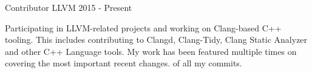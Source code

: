 
\begin{cventries}

  \cventry
    {Contributor}
    {LLVM}
    {}
    {2015 - Present}
    {
      \begin{cvitems}
        Participating in LLVM-related projects and working on Clang-based C++
        tooling. This includes contributing to Clangd, Clang-Tidy, Clang
        Static Analyzer and other C++ Language tools. My work has been
        featured multiple times on 
        covering the most important recent changes.
        of all my commits.
      \end{cvitems}
    }

\end{cventries}
